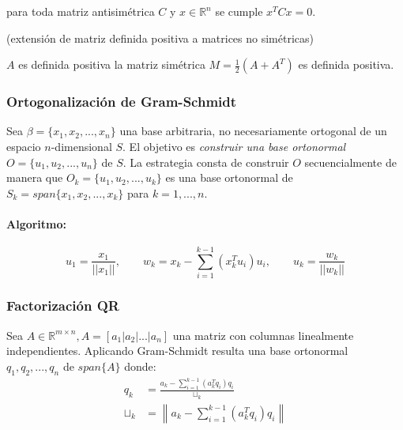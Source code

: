 para toda matriz antisimétrica \(C\) y
\(x \in \ensuremath{\mathbb{R}}^n\) se cumple \(x^T C x = 0\).

\Definicion (extensión de matriz definida positiva a matrices no
simétricas)

\(A\) es definida positiva \sii la matriz simétrica
\(M = \frac{1}{2} (A + A^T)\) es definida positiva.

\hypertarget{ortogonalizaciuxf3n-de-gram-schmidt}{%
\subsubsection{Ortogonalización de
Gram-Schmidt}\label{ortogonalizaciuxf3n-de-gram-schmidt}}

Sea \(\beta = \{x_1, x_2, ..., x_n\}\) una base arbitraria, no
necesariamente ortogonal de un espacio \(n\)-dimensional \(S\). El
objetivo es \emph{construir una base ortonormal}
\(O = \{u_1, u_2, ..., u_n\}\) de \(S\). La estrategia consta de
construir \(O\) secuencialmente de manera que
\(O_k = \{u_1, u_2, ..., u_k\}\) es una base ortonormal de
\(S_k = span\{x_1, x_2, ..., x_k\}\) para \(k = 1,...,n\).

\hypertarget{algoritmo-1}{%
\paragraph{Algoritmo:}\label{algoritmo-1}}

\[
u_1 = \frac{x_1}{||x_1||}, \qquad w_k = x_k - \sum_{i=1}^{k-1} (x_k^T u_i) u_i,
   \qquad u_k = \frac{w_k}{||w_k||}
\]

\hypertarget{factorizaciuxf3n-qr}{%
\subsubsection{Factorización QR}\label{factorizaciuxf3n-qr}}

Sea
\(A \in \ensuremath{\mathbb{R}}^{m \times n}, A = [a_1 | a_2 | ... |a_n]\)
una matriz con columnas linealmente independientes. Aplicando
Gram-Schmidt resulta una base ortonormal \({q_1, q_2, ..., q_n}\) de
\(span\{A\}\) donde: \begin{align*}
q_k &= \frac{a_k - \sum_{i=1}^{k-1} (a_k^T q_i) q_i}{\sqcup_k} \\
\sqcup_k &= \left\| a_k - \sum_{i=1}^{k-1} (a_k^T q_i) q_i \right\|
\end{align*}

